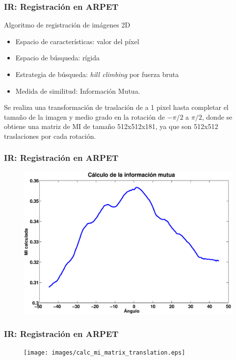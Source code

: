 \documentclass{beamer} %
\begin{document}
\begin{frame}
\frametitle{IR: Registración en ARPET}

Algoritmo de registración de imágenes 2D

\begin{itemize}
\pause
\item Espacio de características: valor del píxel
\pause
\item Espacio de búsqueda: rígida
\pause
\item Estrategia de búsqueda: \textit{hill climbing} por fuerza bruta
\pause
\item Medida de similitud: Información Mutua.
\end{itemize}

\pause
\begin{block}{}
  Se realiza una transformación de traslación de a 1 pixel hasta completar el tamaño de la imagen y medio grado en la rotación de $-\pi/2$ a $\pi/2$, donde se obtiene una matriz de MI de tamaño 512x512x181, ya que son 512x512 traslaciones por cada rotación.
\end{block}

\end{frame}

\begin{frame}
\frametitle{IR: Registración en ARPET}

\begin{figure}
  \includegraphics[width=\textwidth]{images/calc_mi_matrix_rotation.eps}
\end{figure}

\end{frame}

\begin{frame}
\frametitle{IR: Registración en ARPET}

\begin{figure}
  \texttt{[image: images/calc\_mi\_matrix\_translation.eps]}
\end{figure}

\end{frame}
\end{document}
